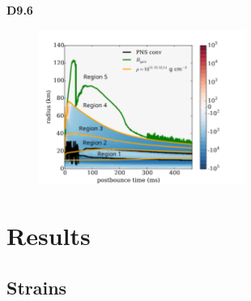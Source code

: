 \documentclass[aspectratio=169]{beamer}
\begin{document}
\begin{frame}

  \hspace{16em}\textbf{D9.6}
  \vspace{-0.5em}
  \begin{figure}
    \includegraphics[width=0.6\textwidth]{Figures/D9.6_regions.pdf}
  \end{figure}

\end{frame}

\section{Results}

\subsection{Strains}
\end{document}

